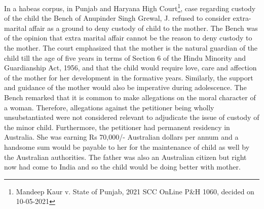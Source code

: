 \begin{multicols}{2}
\vspace{-.15cm}

\noi
In a habeas corpus, in Punjab and Haryana High Court\footnote{Mandeep Kaur v. State of Punjab, 2021 SCC OnLine P\&H 1060, decided on 10-05-2021}, case regarding custody of the child the Bench of Anupinder Singh Grewal, J. refused to consider extra-marital affair as a ground to deny custody of child to the mother. The Bench was of the opinion that extra marital affair cannot be
the reason to deny custody to the mother. The court emphasized that the mother is the natural
guardian of the child till the age of five years in terms of Section 6 of the Hindu Minority and
Guardianship Act, 1956, and that the child would require love, care and affection of the mother
for her development in the formative years. Similarly, the support and guidance of the mother
would also be imperative during adolescence. The Bench remarked that it is common to make
allegations on the moral character of a woman. Therefore, allegations against the petitioner being
wholly unsubstantiated were not considered relevant to adjudicate the issue of custody of the
minor child. Furthermore, the petitioner had permanent residency in Australia. She was earning
Rs 70,000/- Australian dollars per annum and a handsome sum would be payable to her for the
maintenance of child as well by the Australian authorities. The father was also an Australian
citizen but right now had come to India and so the child would be doing better with mother.


\end{multicols}
